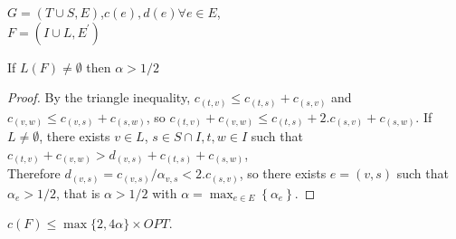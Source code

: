 \documentclass{endm}
\begin{document}
\begin{algorithm}[H]
\small
\centering
\begin{algorithmic}[1]
\Require $G=(T\cup S,E)$,$c(e),d(e) \forall e \in E$,
         \Else
    \EndIf
\EndWhile \\
\Return $F=(I\cup L,E^{\prime})$
\end{algorithmic}
\end{algorithm}

\clearpage

\begin{lem}\label{lema}
If $L(F) \neq \emptyset$ then $\alpha>1/2$
\end{lem}
\begin{proof}
By the triangle inequality, $c_{(t,v)}\leq c_{(t,s)}+c_{(s,v)}$ and
$c_{(v,w)}\leq c_{(v,s)}+c_{(s,w)}$, so
$c_{(t,v)}+c_{(v,w)} \leq c_{(t,s)}+2.c_{(s,v)}+ c_{(s,w)}$. If $L \neq \emptyset$, there exists $v \in L$, $s \in S \cap I, t,w \in I$ such that
$c_{(t,v)}+c_{(v,w)}>d_{(v,s)}+c_{(t,s)}+c_{(s,w)}$,\\ %
Therefore $d_{(v,s)} = c_{(v,s)}/\alpha_{v,s }< 2.c_{(s,v)}$, so there exists $e=(v,s)$ such that $\alpha_{e} > 1/2$, that is $\alpha > 1/2$ with $\alpha = \max_{e\in E} \left\{\alpha_{e} \right\}$.

\end{proof}
\begin{thm}
$c(F) \leq \max\{2,4 \alpha\}\times  OPT$.
\end{thm}
\end{document}
